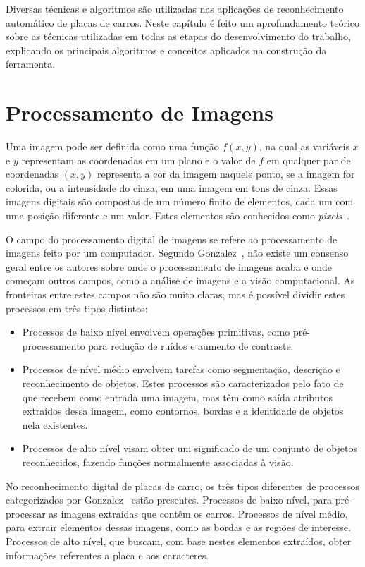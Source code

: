 Diversas técnicas e algoritmos são utilizadas nas aplicações de reconhecimento
automático de placas de carros. Neste capítulo é feito um aprofundamento teórico
sobre as técnicas utilizadas em todas as etapas do desenvolvimento do trabalho,
explicando os principais algoritmos e conceitos aplicados na construção da
ferramenta.

\section{Processamento de Imagens}
\label{sec:processamentoimagens}

Uma imagem pode ser definida como uma função $f(x, y)$, na qual as variáveis $x$
e $y$ representam as coordenadas em um plano e o valor de $f$ em qualquer par de
coordenadas $(x, y)$ representa a cor da imagem naquele ponto, se a imagem for
colorida, ou a intensidade do cinza, em uma imagem em tons de cinza. Essas
imagens digitais são compostas de um número finito de elementos, cada um com uma
posição diferente e um valor. Estes elementos são conhecidos como
\emph{pixels}~\cite{gonzalez1977digital}.

O campo do processamento digital de imagens se refere ao processamento de
imagens feito por um computador. Segundo Gonzalez~\cite{gonzalez1977digital},
não existe um consenso geral entre os autores sobre onde o processamento de
imagens acaba e onde começam outros campos, como a análise de imagens e a visão
computacional. As fronteiras entre estes campos não são muito claras, mas é
possível dividir estes processos em três tipos distintos:

\begin{itemize}
	\item Processos de baixo nível envolvem operações primitivas, como pré-processamento para redução de ruídos e aumento de contraste.
	\item Processos de nível médio envolvem tarefas como segmentação, descrição e reconhecimento de objetos. Estes processos são caracterizados pelo fato de que recebem como entrada uma imagem, mas têm como saída atributos extraídos dessa imagem, como contornos, bordas e a identidade de objetos nela existentes.
	\item Processos de alto nível visam obter um significado de um conjunto de objetos reconhecidos, fazendo funções normalmente associadas à visão.
\end{itemize}

No reconhecimento digital de placas de carro, os três tipos diferentes de
processos categorizados por Gonzalez~\cite{gonzalez1977digital} estão presentes.
Processos de baixo nível, para pré-processar as imagens extraídas que contêm os
carros. Processos de nível médio, para extrair elementos dessas imagens, como as
bordas e as regiões de interesse. Processos de alto nível, que buscam, com base
nestes elementos extraídos, obter informações referentes a placa e aos
caracteres.

